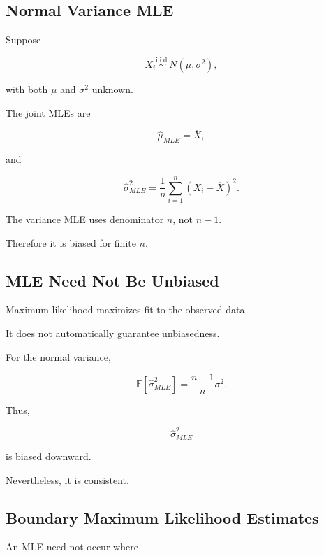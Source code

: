 \subsection{Normal Variance MLE}
\label{subsec:normal-variance-mle}

Suppose

\[
X_i
\overset{\text{i.i.d.}}{\sim}
N(\mu,\sigma^2),
\]

with both \(\mu\) and \(\sigma^2\) unknown.

The joint MLEs are

\[
\boxed{
\widehat{\mu}_{MLE}
=
\overline{X},
}
\]

and

\[
\boxed{
\widehat{\sigma}^2_{MLE}
=
\frac1n
\sum_{i=1}^{n}
(X_i-\overline{X})^2.
}
\]

The variance MLE uses denominator \(n\), not \(n-1\).

Therefore it is biased for finite \(n\).

\subsection{MLE Need Not Be Unbiased}
\label{subsec:mle-not-unbiased}

Maximum likelihood maximizes fit to the observed data.

It does not automatically guarantee unbiasedness.

For the normal variance,

\[
\mathbb{E}
[
\widehat{\sigma}^2_{MLE}
]
=
\frac{n-1}{n}\sigma^2.
\]

Thus,

\[
\boxed{
\widehat{\sigma}^2_{MLE}
}
\]

is biased downward.

Nevertheless, it is consistent.

\subsection{Boundary Maximum Likelihood Estimates}
\label{subsec:boundary-mle}

An MLE need not occur where

